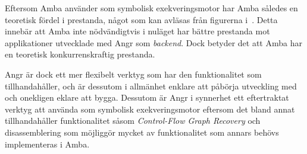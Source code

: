 Eftersom Amba använder \stoe{} som symbolisk exekveringsmotor har Amba
således en teoretisk fördel i prestanda, något som kan avläsas från figurerna
i~\cite[Figur~1-5]{systematic_comparison_symbex}. Detta innebär att Amba inte
nödvändigtvis i nuläget har bättre prestanda mot applikationer utvecklade
med Angr som \emph{backend}. Dock betyder det att Amba har en teoretisk
konkurrenskraftig prestanda.

Angr är dock ett mer flexibelt verktyg som har den funktionalitet som \stoe{}
tillhandahåller, och är dessutom i allmänhet enklare att påbörja utveckling med
och onekligen eklare att bygga. Dessutom är Angr i synnerhet ett eftertraktat
verktyg att använda som symbolisk exekveringsmotor eftersom det bland annat
tillhandahåller funktionalitet såsom \emph{Control-Flow Graph Recovery} och
disassemblering som möjliggör mycket av funktionalitet som annars behövs
implementeras i Amba.
